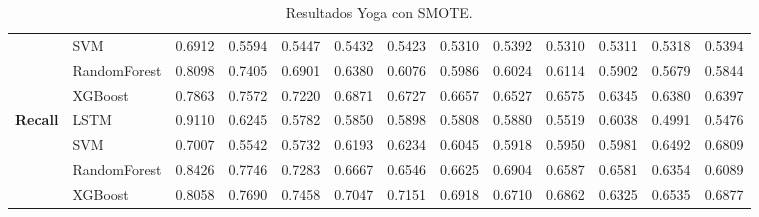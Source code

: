 \begin{table}[h]
\begin{adjustbox}{max width=15cm}
\begin{tabular}{|c|l|r|r|r|r|r|r|r|r|r|r|r|}
			& SVM &  0.6912 &  0.5594 &  0.5447 &  0.5432 &  0.5423 &  0.5310 &  0.5392 &  0.5310 &  0.5311 &  0.5318 &  0.5394 \\
			& RandomForest &  0.8098 &  0.7405 &  0.6901 &  0.6380 &  0.6076 &  0.5986 &  0.6024 &  0.6114 &  0.5902 &  0.5679 &  0.5844 \\
			& XGBoost &  0.7863 &  0.7572 &  0.7220 &  0.6871 &  0.6727 &  0.6657 &  0.6527 &  0.6575 &  0.6345 &  0.6380 &  0.6397 \\
			\hline
			\textbf{Recall} & LSTM &  0.9110 &  0.6245 &  0.5782 &  0.5850 &  0.5898 &  0.5808 &  0.5880 &  0.5519 &  0.6038 &  0.4991 &  0.5476 \\
			& SVM &  0.7007 &  0.5542 &  0.5732 &  0.6193 &  0.6234 &  0.6045 &  0.5918 &  0.5950 &  0.5981 &  0.6492 &  0.6809 \\
			& RandomForest &  0.8426 &  0.7746 &  0.7283 &  0.6667 &  0.6546 &  0.6625 &  0.6904 &  0.6587 &  0.6581 &  0.6354 &  0.6089 \\
			& XGBoost &  0.8058 &  0.7690 &  0.7458 &  0.7047 &  0.7151 &  0.6918 &  0.6710 &  0.6862 &  0.6325 &  0.6535 &  0.6877 \\
			\hline
		\end{tabular}
	\end{adjustbox}
	\caption{Resultados Yoga con SMOTE.}
	\label{tab:Yoga_SMOTE}
\end{table}
